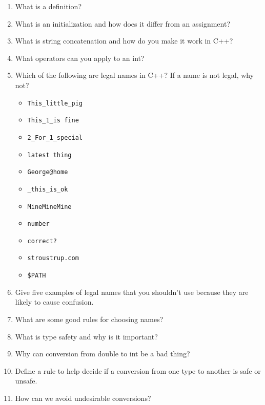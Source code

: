 \documentclass[11pt]{article}
\begin{document}
\begin{enumerate}
\item What is a definition?
\item What is an initialization and how does it differ from an assignment?
\item What is string concatenation and how do you make it work in C++?
\item What operators can you apply to an int?
\item Which of the following are legal names in C++? If a name is not legal, why not?
\begin{itemize}
\item \texttt{This\_little\_pig}
\item \texttt{This\_1\_is fine}
\item \texttt{2\_For\_1\_special}
\item \texttt{latest thing}
\item \texttt{George@home}
\item \texttt{\_this\_is\_ok}
\item \texttt{MineMineMine}
\item \texttt{number}
\item \texttt{correct?}
\item \texttt{stroustrup.com}
\item \texttt{\$PATH}
\end{itemize}
\item Give five examples of legal names that you shouldn’t use because they are likely to cause confusion.
\item What are some good rules for choosing names?
\item What is type safety and why is it important?
\item Why can conversion from double to int be a bad thing?
\item Define a rule to help decide if a conversion from one type to another is safe or unsafe.
\item How can we avoid undesirable conversions?
\end{enumerate}
\end{document}
